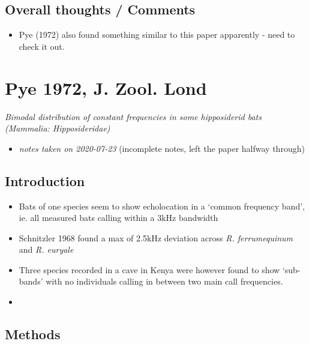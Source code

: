 \documentclass[
]{book}
\providecommand{\tightlist}{%
  \setlength{\itemsep}{0pt}\setlength{\parskip}{0pt}}
\begin{document}
\hypertarget{overall-thoughts-comments-1}{%
\section{Overall thoughts / Comments}\label{overall-thoughts-comments-1}}

\begin{itemize}
\tightlist
\item
  Pye (1972) also found something similar to this paper apparently - need to check it out.
\end{itemize}

\hypertarget{pye-1972-j.-zool.-lond}{%
\chapter{Pye 1972, J. Zool. Lond}\label{pye-1972-j.-zool.-lond}}


\emph{Bimodal distribution of constant frequencies in some hipposiderid bats (Mammalia: Hipposideridae)} \citep{pye1972bimodal}

\begin{itemize}
\tightlist
\item
  \emph{notes taken on 2020-07-23} (incomplete notes, left the paper halfway through)
\end{itemize}

\hypertarget{introduction-2}{%
\section{Introduction}\label{introduction-2}}

\begin{itemize}
\tightlist
\item
  Bats of one species seem to show echolocation in a `common frequency band', ie. all measured bats calling within a 3kHz bandwidth
\item
  Schnitzler 1968 found a max of 2.5kHz deviation across \emph{R. ferrumequinum} and \emph{R. euryale}
\item
  Three species recorded in a cave in Kenya were however found to show `sub-bands' with no individuals calling in between two main call frequencies.
\item
\end{itemize}

\hypertarget{methods-5}{%
\section{Methods}\label{methods-5}}
\end{document}

